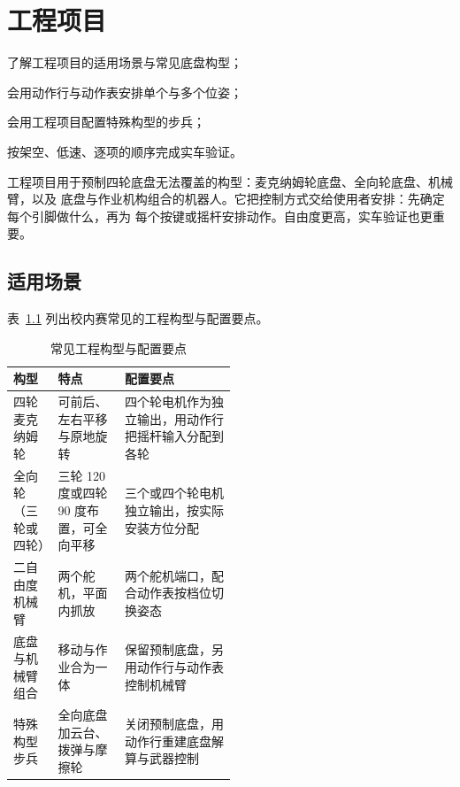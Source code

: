\chapter{工程项目}
\label{ch:concise-engineer}

\begin{introduction}
  \item 了解工程项目的适用场景与常见底盘构型；
  \item 会用动作行与动作表安排单个与多个位姿；
  \item 会用工程项目配置特殊构型的步兵；
  \item 按架空、低速、逐项的顺序完成实车验证。
\end{introduction}

工程项目用于预制四轮底盘无法覆盖的构型：麦克纳姆轮底盘、全向轮底盘、机械臂，以及
底盘与作业机构组合的机器人。它把控制方式交给使用者安排：先确定每个引脚做什么，再为
每个按键或摇杆安排动作。自由度更高，实车验证也更重要。

\section{适用场景}

表~\ref{tab:concise-engineer-configs} 列出校内赛常见的工程构型与配置要点。

\begin{table}[htbp]
  \centering
  \small
  \begin{tabularx}{\linewidth}{@{}>{\raggedright\arraybackslash}p{0.20\linewidth}
      >{\raggedright\arraybackslash}p{0.30\linewidth}
      >{\raggedright\arraybackslash}X@{}}
    \toprule
    构型 & 特点 & 配置要点 \\
    \midrule
    四轮麦克纳姆轮 & 可前后、左右平移与原地旋转 & 四个轮电机作为独立输出，用动作行把摇杆输入分配到各轮 \\
    全向轮（三轮或四轮） & 三轮 120 度或四轮 90 度布置，可全向平移 & 三个或四个轮电机独立输出，按实际安装方位分配 \\
    二自由度机械臂 & 两个舵机，平面内抓放 & 两个舵机端口，配合动作表按档位切换姿态 \\
    底盘与机械臂组合 & 移动与作业合为一体 & 保留预制底盘，另用动作行与动作表控制机械臂 \\
    特殊构型步兵 & 全向底盘加云台、拨弹与摩擦轮 & 关闭预制底盘，用动作行重建底盘解算与武器控制 \\
    \bottomrule
  \end{tabularx}
  \caption{常见工程构型与配置要点}
  \label{tab:concise-engineer-configs}
\end{table}

